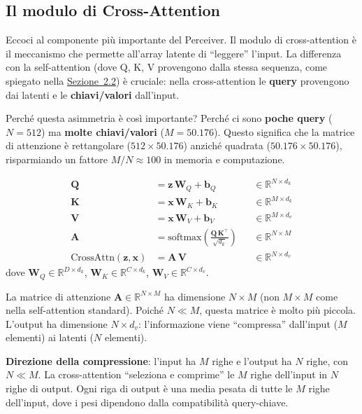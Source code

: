 \documentclass[12pt,a4paper]{article}
\begin{document}
\subsection{Il modulo di Cross-Attention} \label{sec:cross_attention}

Eccoci al componente pi\`u importante del Perceiver. Il modulo di cross-attention \`e il meccanismo che permette all'array latente di ``leggere'' l'input. La differenza con la self-attention (dove Q, K, V provengono dalla stessa sequenza, come spiegato nella \hyperref[sec:attention]{Sezione~2.2}) \`e cruciale: nella cross-attention le \textbf{query} provengono dai latenti e le \textbf{chiavi/valori} dall'input.

Perch\'e questa asimmetria \`e cos\`i importante? Perch\'e ci sono \textbf{poche query} ($N = 512$) ma \textbf{molte chiavi/valori} ($M = 50.176$). Questo significa che la matrice di attenzione \`e rettangolare ($512 \times 50.176$) anzich\'e quadrata ($50.176 \times 50.176$), risparmiando un fattore $M/N \approx 100$ in memoria e computazione.

\begin{formulabox}
\begin{align}
    \mathbf{Q} &= \mathbf{z}\, \mathbf{W}_Q + \mathbf{b}_Q &&\in \mathbb{R}^{N \times d_k} \label{eq:ca_Q}\\[4pt]
    \mathbf{K} &= \mathbf{x}\, \mathbf{W}_K + \mathbf{b}_K &&\in \mathbb{R}^{M \times d_k} \label{eq:ca_K}\\[4pt]
    \mathbf{V} &= \mathbf{x}\, \mathbf{W}_V + \mathbf{b}_V &&\in \mathbb{R}^{M \times d_v} \label{eq:ca_V}\\[4pt]
    \mathbf{A} &= \text{softmax}\!\left(\frac{\mathbf{Q}\,\mathbf{K}^\top}{\sqrt{d_k}}\right) &&\in \mathbb{R}^{N \times M} \label{eq:ca_A}\\[4pt]
    \text{CrossAttn}(\mathbf{z}, \mathbf{x}) &= \mathbf{A}\,\mathbf{V} &&\in \mathbb{R}^{N \times d_v} \label{eq:ca_out}
\end{align}
dove $\mathbf{W}_Q \in \mathbb{R}^{D \times d_k}$, $\mathbf{W}_K \in \mathbb{R}^{C \times d_k}$, $\mathbf{W}_V \in \mathbb{R}^{C \times d_v}$.
\end{formulabox}

\begin{notabox}
La matrice di attenzione $\mathbf{A} \in \mathbb{R}^{N \times M}$ ha dimensione $N \times M$ (non $M \times M$ come nella self-attention standard). Poich\'e $N \ll M$, questa matrice \`e molto pi\`u piccola. L'output ha dimensione $N \times d_v$: l'informazione viene ``compressa'' dall'input ($M$ elementi) ai latenti ($N$ elementi).

\textbf{Direzione della compressione}: l'input ha $M$ righe e l'output ha $N$ righe, con $N \ll M$. La cross-attention ``seleziona e comprime'' le $M$ righe dell'input in $N$ righe di output. Ogni riga di output \`e una media pesata di tutte le $M$ righe dell'input, dove i pesi dipendono dalla compatibilit\`a query-chiave.
\end{notabox}
\end{document}
